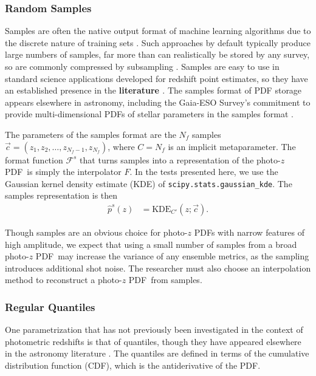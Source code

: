 \documentclass[\docopts]{\docclass}
\newcommand{\pz}{photo-$z$ PDF}
\begin{document}
\subsubsection{Random Samples}
\label{sec:samples}

Samples are often the native output format of machine learning algorithms due 
to the discrete nature of training sets \citep{de_vicente_dnf_2016}.
Such approaches by default typically produce large numbers of samples, far more 
than can realistically be stored by any survey, so are commonly compressed by 
subsampling \citep{hoyle_dark_2017}.
Samples are easy to use in standard science applications developed for redshift 
point estimates, so they have an established presence in the \textbf{literature 
\citep {bonnett_redshift_2016}}.
The samples format of PDF storage appears elsewhere in astronomy, including the 
Gaia-ESO Survey's commitment to provide multi-dimensional PDFs of stellar 
parameters in the samples format \citep{bailer-jones_gaia_2013}.

The parameters of the samples format are the $N_{f}$ samples $\vec{c}=(z_{1}, 
z_{2}, \dots, z_{N_{f}-1}, z_{N_{f}})$, where $C=N_{f}$ is an implicit 
metaparameter.
The format function $\mathcal{F}^{s}$ that turns samples into a representation 
of the \pz\ is simply the interpolator $F$.
In the tests presented here, we use the Gaussian kernel density estimate (KDE) 
of \texttt{scipy.stats.gaussian\_kde}.
The samples representation is then
\begin{align}
  \label{eq:sampled}
  \hat{p}^{s}(z) &= \mathrm{KDE}_{C'}(z; \vec{c}).
\end{align}

Though samples are an obvious choice for \pz s with narrow features of high 
amplitude, we expect that using a small number of samples from a broad \pz\ may 
increase the variance of any ensemble metrics, as the sampling introduces 
additional shot noise.
The researcher must also choose an interpolation method to reconstruct a \pz\ 
from samples.

\subsubsection{Regular Quantiles}
\label{sec:quantiles}

One parametrization that has not previously been investigated in the context of 
photometric redshifts is that of quantiles, though they have appeared elsewhere 
in the astronomy literature \citep{sun_star_2015, pizzocaro_results_2016, 
laycock_x-ray_2017}.
The quantiles are defined in terms of the cumulative distribution function 
(CDF), which is the antiderivative of the PDF.
\end{document}
